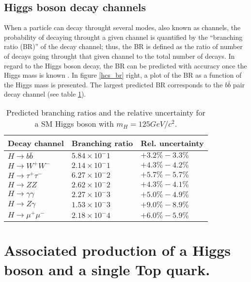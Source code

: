 \subsection{Higgs boson decay channels}\label{sec:decays}

\noindent When a particle can decay throught several modes, also known as channels, the probability of decaying throught a given channel is quantified by the ``branching ratio (BR)'' of the decay channel; thus, the BR is defined as the ratio of number of decays going throught that given channel to the total number of decays. In regard to the Higgs boson decay, the BR can be predicted with accuracy once the Higgs mass is known \cite{riley, denner}. In figure \ref{hcs_br} right, a plot of the BR as a function of the Higgs mass is presented. The largest predicted BR corresponds to the $b\bar{b}$ pair decay channel (see table \ref{hdbr}). %

\begin{center}
\begin{table}[h]
\centering
\begin{tabular}{lll}\hline
Decay channel       & Branching ratio   & Rel. uncertainty\\\hline
$H\to b\bar{b}$     & $5.84\times10^-1$ & $+3.2\%-3.3\%$\\
$H\to W^+W^-$       & $2.14\times10^-1$ & $+4.3\%-4.2\%$\\
$H\to\tau^+\tau^-$  & $6.27\times10^-2$ & $+5.7\%-5.7\%$\\
$H\to ZZ$           & $2.62\times10^-2$ & $+4.3\%-4.1\%$\\
$H\to \gamma\gamma$ & $2.27\times10^-3$ & $+5.0\%-4.9\%$\\
$H\to Z\gamma$      & $1.53\times10^-3$ & $+9.0\%-8.9\%$\\
$H\to\mu^+\mu^-$    & $2.18\times10^-4$ & $+6.0\%-5.9\%$\\\hline
\end{tabular}
\caption[Predicted branching ratios for a SM Higgs boson with $m_H = 125$ GeV/c$^2$.]{Predicted branching ratios and the relative uncertainty for a SM Higgs boson with $m_H = 125GeV/c^2$.\cite{pdg}}\label{hdbr}
\end{table}
\end{center}
\section{Associated production of a Higgs boson and a single Top quark.}\label{sec:thq}

